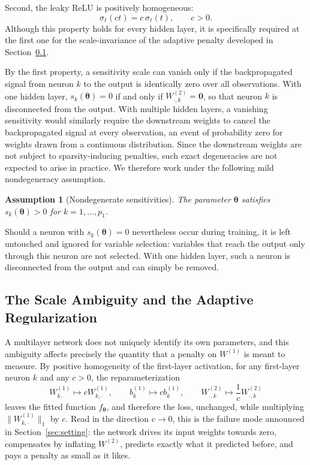 \documentclass[twoside,11pt]{article}
\newtheorem{assumption}{Assumption}
\newcommand{\bth}{\boldsymbol{\theta}}
\newcommand{\bzero}{\mathbf{0}}
\newcommand{\Wone}{W^{(1)}}
\newcommand{\PenWonek}{\|W^{(1)}_{k, \cdot}\|_1}
\begin{document}
Second, the leaky ReLU is positively homogeneous:
\begin{equation*}
    \sigma_\ell(ct)=c\,\sigma_\ell(t),\qquad c>0.
\end{equation*}
Although this property holds for every hidden layer, it is specifically required at the first one for the scale-invariance of the adaptive penalty developed in Section~\ref{sec:gauge}. 

By the first property, a sensitivity scale can vanish only if the
backpropagated signal from neuron $k$ to the output is identically zero over all observations. With one hidden layer, $s_k(\bth)=0$ if and only if $W^{(2)}_{\cdot,k}=\bzero$, so that neuron $k$ is disconnected from the output. With multiple hidden layers, a vanishing sensitivity would similarly require the downstream weights to cancel the backpropagated signal at every observation, an event of probability zero for weights drawn from a continuous distribution. Since the downstream weights are not subject to sparsity-inducing penalties, such exact degeneracies are not expected to arise in practice. We therefore work under the following mild nondegeneracy assumption.

\begin{assumption}[Nondegenerate sensitivities]\label{ass:sensitivity}
The parameter $\bth$ satisfies $s_k(\bth)>0$ for
$k=1,\ldots,p_1$.
\end{assumption}

Should a neuron with $s_k(\bth)=0$ nevertheless occur during training, it is left untouched and ignored for variable selection: variables that reach the output only through this neuron are not selected. With one hidden layer, such a neuron is disconnected from the output and can simply be removed.

\subsection{The Scale Ambiguity and the Adaptive Regularization}\label{sec:gauge}

A multilayer network does not uniquely identify its own parameters, and this ambiguity affects precisely the quantity that a penalty on $\Wone$ is meant to measure. By positive homogeneity of the first-layer activation, for any first-layer neuron $k$ and any $c>0$, the reparameterization
\begin{equation}\label{eq:positive-rescaling}
    W^{(1)}_{k,\cdot}\mapsto c W^{(1)}_{k,\cdot},\qquad
    b^{(1)}_k\mapsto c b^{(1)}_k,\qquad
    W^{(2)}_{\cdot,k}\mapsto\frac{1}{c}W^{(2)}_{\cdot,k}
\end{equation}
leaves the fitted function $f_{\bth}$, and therefore the loss, unchanged, while multiplying $\PenWonek$ by $c$. Read in the direction $c\to0$, this is the failure mode announced in Section~\ref{sec:setting}: the network drives its input weights towards zero, compensates by inflating $W^{(2)}$, predicts exactly what it predicted before, and pays a penalty as small as it likes.
\end{document}
